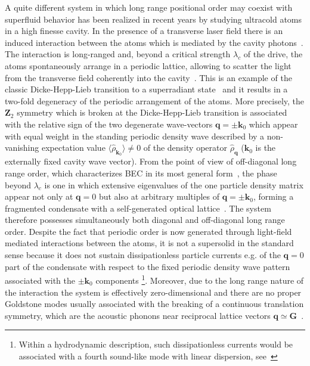 \documentclass[12pt]{iopart}
\begin{document}
A quite different system in which long range positional order may coexist with superfluid behavior 
has been realized in recent years by studying ultracold atoms in a high finesse cavity. In the 
presence of a transverse laser field there is an induced interaction between the atoms 
which is mediated by the cavity photons~\cite{cavity_rmp}. The interaction is long-ranged
and, beyond a critical strength $\lambda_c$ of the drive, the atoms spontaneously arrange in a periodic lattice,
allowing to scatter the light from the transverse field coherently into the cavity~\cite{baumann2010,black2003}.
This is an example of the classic Dicke-Hepp-Lieb transition to a superradiant state~\cite{dicke1954,hepp1973,wang1973,nagy_2010}
and it results in a two-fold degeneracy of the periodic arrangement of the atoms. More precisely, 
the $\mathbf{Z}_2$ symmetry which is broken at the Dicke-Hepp-Lieb transition is associated 
with the relative sign of the two degenerate wave-vectors $\mathbf{q}=\pm\mathbf{k}_0$ which appear with 
equal weight in the standing periodic density wave described by a non-vanishing 
expectation value $\langle\hat{\rho}_{\mathbf{k}_0}\rangle\ne 0$ of the density operator $\hat{\rho}_{\mathbf{q}}$ 
($\mathbf{k}_0$ is the externally fixed cavity wave vector). From the point of view of 
off-diagonal long range order, which characterizes BEC in its most general form~\cite{penrose1956}, 
the phase beyond $\lambda_c$ is one in which extensive eigenvalues of the one particle density matrix appear not only at 
$\mathbf{q}=0$ but also at arbitrary multiples of $\mathbf{q}=\pm\mathbf{k}_0$, forming a fragmented condensate
with a self-generated optical lattice~\cite{piazza_bose,lode_DHL_2017}.
The system therefore possesses simultaneously both diagonal and off-diagonal long range order. 
Despite the fact that periodic order is now generated through light-field mediated interactions between 
the atoms, it is not a supersolid in the standard sense because it does not sustain dissipationless particle 
currents e.g. of the $\mathbf{q}=0$ part of the condensate with respect to the fixed periodic density wave
pattern associated with the $\pm\mathbf{k}_0$ components
\footnote{ Within a hydrodynamic description, such dissipationless currents would be associated 
with a fourth sound-like mode with linear dispersion, see~\cite{liu1978}}.    
Moreover, due to the long range nature of the 
interaction the system is effectively zero-dimensional and there are no proper Goldstone 
modes usually associated with the breaking of a continuous translation symmetry, which are the
acoustic phonons near reciprocal lattice vectors $\mathbf{q}\simeq \mathbf{G}$~\cite{wagner1966}.\\
\end{document}

